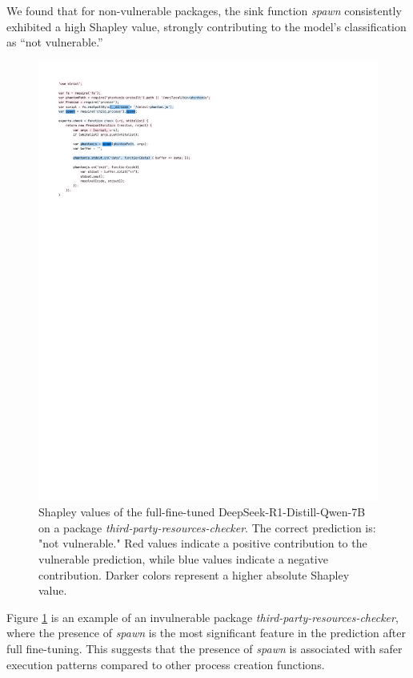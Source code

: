 \documentclass[12pt,openany,oneside,table]{cmuthesis}
\begin{document}
We found that for non-vulnerable packages, the sink function \textit{spawn} consistently exhibited a high Shapley value, strongly contributing to the model’s classification as “not vulnerable.” 
%
\begin{figure}[t!]
  \centering
  \includegraphics[width=\linewidth]{figures/formatted_code.pdf}
  \vspace{-10pt}
  \caption{Shapley values of the full-fine-tuned DeepSeek-R1-Distill-Qwen-7B on a
  package \textit{third-party-resources-checker}. The correct prediction is: "not vulnerable." Red values indicate a positive contribution to the vulnerable prediction, while blue values indicate a negative contribution. Darker colors represent a higher absolute Shapley value. 
  }
  \label{fig:shapley_spawn}
\end{figure}

Figure \ref{fig:shapley_spawn} is an example of an invulnerable package \textit{third-party-resources-checker}, where the presence of \textit{spawn} is the most significant feature in the prediction after full fine-tuning.
This suggests that the presence of \textit{spawn} is associated with safer execution patterns compared to other process creation functions.
\end{document}
